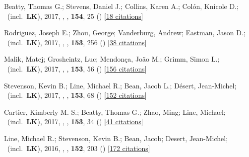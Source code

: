 \item[{\color{numcolor}\scriptsize15}] Beatty, Thomas G.; Stevens, Daniel J.; Collins, Karen A.; Col{\'o}n, Knicole D.; \etal\ (incl.\ \textbf{LK}), 2017, , \aj, \textbf{154}, 25 () [\href{https://ui.adsabs.harvard.edu/abs/2017AJ....154...25B}{18 citations}]

\item[{\color{numcolor}\scriptsize14}] Rodriguez, Joseph E.; Zhou, George; Vanderburg, Andrew; Eastman, Jason D.; \etal\ (incl.\ \textbf{LK}), 2017, , \aj, \textbf{153}, 256 () [\href{https://ui.adsabs.harvard.edu/abs/2017AJ....153..256R}{38 citations}]

\item[{\color{numcolor}\scriptsize13}] Malik, Matej; Grosheintz, Luc; Mendon{\c{c}}a, Jo{\~a}o M.; Grimm, Simon L.; \etal\ (incl.\ \textbf{LK}), 2017, , \aj, \textbf{153}, 56 () [\href{https://ui.adsabs.harvard.edu/abs/2017AJ....153...56M}{156 citations}]

\item[{\color{numcolor}\scriptsize12}] Stevenson, Kevin B.; Line, Michael R.; Bean, Jacob L.; D{\'e}sert, Jean-Michel; \etal\ (incl.\ \textbf{LK}), 2017, , \aj, \textbf{153}, 68 () [\href{https://ui.adsabs.harvard.edu/abs/2017AJ....153...68S}{152 citations}]

\item[{\color{numcolor}\scriptsize11}] Cartier, Kimberly M. S.; Beatty, Thomas G.; Zhao, Ming; Line, Michael; \etal\ (incl.\ \textbf{LK}), 2017, , \aj, \textbf{153}, 34 () [\href{https://ui.adsabs.harvard.edu/abs/2017AJ....153...34C}{41 citations}]

\item[{\color{numcolor}\scriptsize10}] Line, Michael R.; Stevenson, Kevin B.; Bean, Jacob; Desert, Jean-Michel; \etal\ (incl.\ \textbf{LK}), 2016, , \aj, \textbf{152}, 203 () [\href{https://ui.adsabs.harvard.edu/abs/2016AJ....152..203L}{172 citations}]

